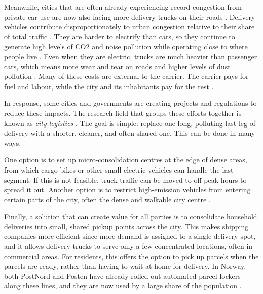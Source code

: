 \documentclass[12pt]{article}
\begin{document}
Meanwhile, cities that are often already experiencing record congestion from private car use are now also facing more delivery trucks on their roads \parencite{lindsey2023distributional}. Delivery vehicles contribute disproportionately to urban congestion relative to their share of total traffic \parencite{itf2022freight}. They are harder to electrify than cars, so they continue to generate high levels of CO2 and noise pollution while operating close to where people live \parencite{COULOMBEL2018514}. Even when they are electric, trucks are much heavier than passenger cars, which means more wear and tear on roads and higher levels of dust pollution \parencite{worldbank_lutp_curriculum}. Many of these costs are external to the carrier. The carrier pays for fuel and labour, while the city and its inhabitants pay for the rest \parencite{ec_internalisation_external_costs}.

In response, some cities and governments are creating projects and regulations to reduce these impacts. The research field that groups these efforts together is known as \textit{city logistics} \parencite{savelsbergh2016}. The goal is simple: replace one long, polluting last leg of delivery with a shorter, cleaner, and often shared one. This can be done in many ways.

One option is to set up micro-consolidation centres at the edge of dense areas, from which cargo bikes or other small electric vehicles can handle the last segment. If this is not feasible, truck traffic can be moved to off-peak hours to spread it out. Another option is to restrict high-emission vehicles from entering certain parts of the city, often the dense and walkable city centre \parencite{civitas2015}.

Finally, a solution that can create value for all parties is to consolidate household deliveries into small, shared pickup points across the city. This makes shipping companies more efficient since more demand is assigned to a single delivery spot, and it allows delivery trucks to serve only a few concentrated locations, often in commercial areas. For residents, this offers the option to pick up parcels when the parcels are ready, rather than having to wait at home for delivery. In Norway, both PostNord and Posten have already rolled out automated parcel lockers along these lines, and they are now used by a large share of the population \parencite{toiparcellockers,posten_hours,portnord_hours}.
\end{document}
